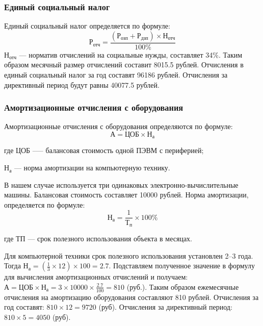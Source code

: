 \subsubsection{Единый социальный налог}
Единый социальный налог определяется по формуле:
\begin{equation}
    \textrm{Р}_\textrm{отч} = \frac{(\textrm{Р}_\textrm{озп} + \textrm{Р}_\textrm{дзп}) \times{} \textrm{Н}_\textrm{отч}} {100\%}
\end{equation}
$\textrm{Н}_\textrm{отч}$ --- норматив отчислений на социальные  нужды, составляет 34\%.
Таким образом месячный размер отчислений составит 8015.5 рублей.
Отчисления в единый социальный налог за год составят 96186 рублей.
Отчисления за директивный период будут равны 40077.5 рублей.

\subsubsection{Амортизационные  отчисления  с  оборудования}
Амортизационные отчисления с оборудования определяются по формуле:
\begin{equation}
    \textrm{А} = \textrm{ЦОБ} \times{} \textrm{Н}_\textrm{а}
\end{equation}
\begin{ESKDexplanation}
	\item[где ]{} $\textrm{ЦОБ}$ --— балансовая стоимость одной ПЭВМ с периферией;
	\item{} $\textrm{Н}_\textrm{а}$ --- норма амортизации на компьютерную технику.
\end{ESKDexplanation}
В нашем случае используется три одинаковых электронно-вычислительные машины.
Балансовая стоимость составляет 10000 рублей.
Норма амортизации, определяется по формуле:
\begin{equation}
	\textrm{Н}_\textrm{а} = \frac{1}{\textrm{Т}_\textrm{п}} \times{} 100\%
\end{equation}
\begin{ESKDexplanation}
	\item[где ] ТП --- срок полезного использования объекта в месяцах.
\end{ESKDexplanation}
Для компьютерной техники срок полезного использования установлен 2--3 года.
Тогда $Н_{а}= (\frac{1}{3} \times{} 12) \times{} 100 = 2.7$.
Подставляем полученное значение в формулу для вычисления амортизационных отчислений
и получаем: $А = ЦОБ \times{} Н_{а} = 3 \times{} 10000 \times{} \frac{2.7}{100} = 810$ (руб.).
Таким образом ежемесячные отчисления на амортизацию оборудования составляют
810 рублей. Отчисления за год составят: $810 \times{} 12 = 9720$ (руб). Отчисления за
директивный период: $810 \times{} 5 = 4050$ (руб).

